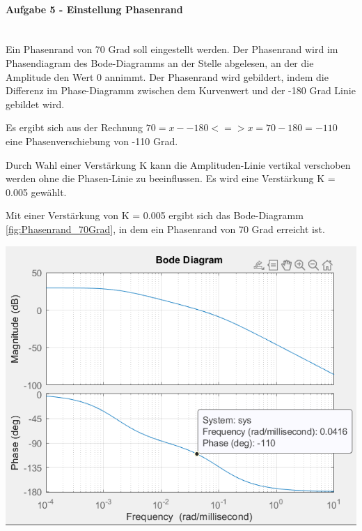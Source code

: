 \documentclass[            %
draft = false,             		%
paper = A4,                		%
pagesize = pdftex,         		%
fontsize = 10pt,           		%
DIV=15,                    		%
twoside = false,           		%
twocolumn = false,         		%
parskip = full,           		%
chapterprefix = false,      		%
appendixprefix = true,     		%
headinclude = false,       		%
footinclude = false,       		%
mpinclude = false,         		%
numbers = auto,            		%
cleardoublepage = plain,   		%
footnotes = multiple,      		%
titlepage = true,          		%
headings = normal,         		%
open = right,              		%
bibliography = openstyle,  		%
listof = chaptergapline,   		%
overfullrule = true,
]{scrbook}
\begin{document}

\paragraph{Aufgabe 5 - Einstellung Phasenrand}~\\

Ein Phasenrand von 70 Grad soll eingestellt werden.
Der Phasenrand wird im Phasendiagram des Bode-Diagramms an der Stelle abgelesen, an der die Amplitude den Wert 0 annimmt.
Der Phasenrand wird gebildert, indem die Differenz im Phase-Diagramm zwischen dem Kurvenwert und der -180 Grad Linie gebildet wird.

Es ergibt sich aus der Rechnung $70 = x - -180 <=> x = 70 - 180 = -110$ eine Phasenverschiebung von -110 Grad.

Durch Wahl einer Verstärkung K kann die Amplituden-Linie vertikal verschoben werden ohne die Phasen-Linie zu beeinflussen.
Es wird eine Verstärkung K = 0.005 gewählt.

Mit einer Verstärkung von K = 0.005 ergibt sich das Bode-Diagramm \ref{fig:Phasenrand_70Grad}, in dem ein Phasenrand von 70 Grad erreicht ist.

\begin{center}
   \begin{minipage}[b]{0.6\textwidth}
      \includegraphics[scale=0.7]{Bilder/Phasenrand_70Grad.PNG}
      \label{fig:Phasenrand_70Grad} 
   \end{minipage}
\end{center}
\end{document}
